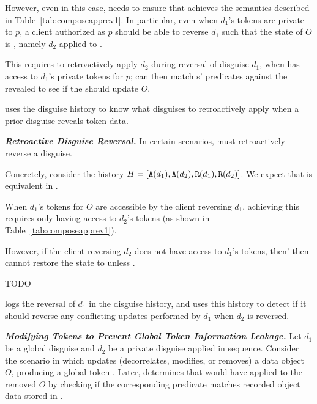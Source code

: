 However, even in this case, \sys needs to ensure that 
achieves the semantics described in Table~\ref{tab:composeapprev1}. In particular, even when $d_1$'s
tokens are private to $p$, a client authorized as $p$ should be able to reverse $d_1$ such that the
state of $O$ is \ohist{[\app{d_2}]}, namely $d_2$ applied to \ostart. 

This requires \sys to retroactively apply $d_2$ during reversal of disguise $d_1$, when \sys has
access to $d_1$'s private tokens for $p$; \sys can then match s' predicates against the
revealed \ostart to see if the  should update $O$.

\sys uses the disguise history to know what disguises to retroactively apply when a prior disguise
reveals token data.

\vspace{6pt}\noindent\textbf{\emph{Retroactive Disguise Reversal.}}
In certain scenarios, \sys must retroactively reverse a disguise. 

Concretely, consider the history $H = [\texttt{A}({d_1}),\texttt{A}({d_2}),\texttt{R}({d_1}),\texttt{R}({d_2})]$.
We expect that  is equivalent in \ostart.

When $d_1$'s tokens for $O$ are accessible by the client reversing $d_1$, achieving this requires
only having access to $d_2$'s tokens (as shown in Table~\ref{tab:composeapprev1}).

However, if the client reversing $d_2$ does not have access to $d_1$'s tokens, then'
then \sys cannot restore the state to \ostart unless . 

TODO 

\sys logs the reversal of $d_1$ in the disguise history, and uses this history to detect if it
should reverse any conflicting updates performed by $d_1$ when $d_2$ is reversed.

\vspace{6pt}\noindent\textbf{\emph{Modifying Tokens to Prevent Global Token Information Leakage.}}
%
Let $d_1$ be a global disguise and $d_2$ be a private disguise applied in sequence.
Consider the scenario in which  updates (decorrelates, modifies, or removes) a data object
$O$, producing a global token . Later, \sys determines that  would have applied to the
removed $O$ by checking if the corresponding  predicate matches recorded object data stored in .

